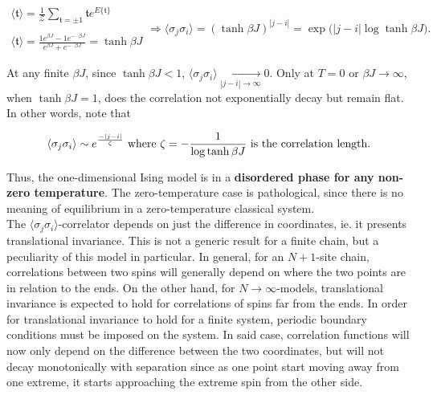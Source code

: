 \documentclass{homework}
\begin{document}
\begin{equation}
\begin{array}{ccc}
    \langle \mathfrak{t} \rangle = \frac{1}{\mathcal{Z}}\sum_{\mathfrak{t} =  \pm 1} \mathfrak{t} e^{E\{\mathfrak{t}\}}\\
    \\
    \langle \mathfrak{t} \rangle  = \frac{1 e^{\beta J} - 1 e^{-\cdot \beta J}}{e^{\beta J} +  e^{-\cdot \beta J}} = \tanh \beta J
\end{array} \Rightarrow \langle \sigma_j \sigma_i \rangle = (\tanh \beta J)^{|j-i|} = \exp \bigg(|j-i| \log \tanh \beta J\bigg).
\end{equation}

At any finite $\beta J$, since $\tanh \beta J < 1$, $\langle \sigma_j \sigma_i \rangle  \underset{|j-i| \rightarrow \infty}{\longrightarrow} 0$. Only at $T=0$ or $\beta J \rightarrow \infty$, when $\tanh \beta J = 1$, does the correlation not exponentially decay but remain flat. In other words, note that 

\begin{equation}
    \langle \sigma_j \sigma_i \rangle \sim e^{\frac{-|j-i|}{\zeta}} \textnormal{ where } \zeta = -\frac{1}{\log \tanh \beta J} \textnormal{ is the correlation length.}
\end{equation}

Thus, the one-dimensional Ising model is in a \textbf{disordered phase for any non-zero temperature}. The zero-temperature case is pathological, since there is no meaning of equilibrium in a zero-temperature classical system. 
\\

The $\langle \sigma_j \sigma_i \rangle$-correlator depends on just the difference in coordinates, ie. it presents translational invariance. This is not a generic result for a finite chain, but a peculiarity of this model in particular. In general, for an $N+1$-site chain, correlations between two spins will generally depend on where the two points are in relation to the ends. On the other hand, for $N\rightarrow\infty$-models, translational invariance is expected to hold for correlations of spins far from the ends. In order for translational invariance to hold for a finite system, periodic boundary conditions must be imposed on the system. In said case, correlation functions will now only depend on the difference between the two coordinates, but will not decay monotonically with separation since as one point start moving away from one extreme, it starts approaching the extreme spin from the other side. \\
\end{document}
